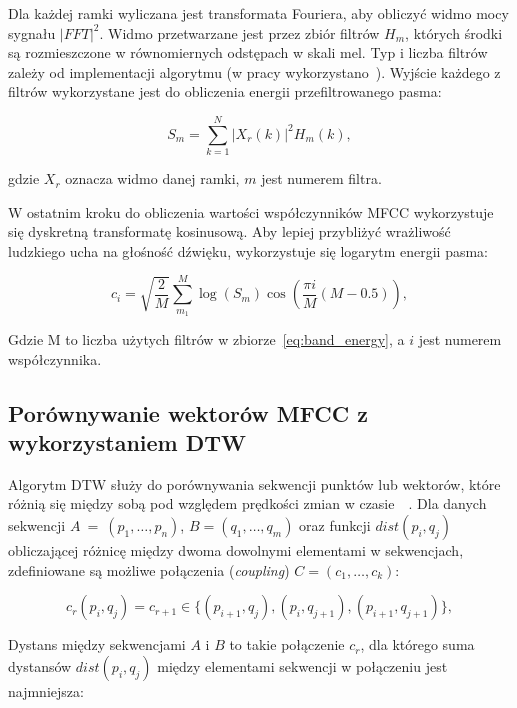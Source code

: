Dla każdej ramki wyliczana jest transformata Fouriera, aby
obliczyć widmo mocy sygnału $|FFT|^2$. Widmo przetwarzane jest
przez zbiór filtrów $H_m$, których środki są rozmieszczone
w równomiernych odstępach w skali mel. Typ i liczba filtrów zależy
od implementacji algorytmu (w pracy wykorzystano~\cite{librosa}).
Wyjście każdego z filtrów wykorzystane
jest do obliczenia energii przefiltrowanego pasma:

\begin{equation}
  S_m = \sum_{k=1}^{N}| X_r(k) |^2 H_m(k),
  \label{eq:band_energy}
\end{equation}

\noindent
gdzie $X_r$ oznacza widmo danej ramki, $m$ jest numerem filtra.

W ostatnim kroku do obliczenia wartości współczynników MFCC
wykorzystuje się dyskretną transformatę kosinusową.
Aby lepiej przybliżyć wrażliwość ludzkiego ucha na głośność dźwięku,
wykorzystuje się logarytm energii pasma:

\begin{equation}
  c_i = \sqrt{\frac{2}{M}} \sum_{m_1}^{M} \log(S_m) \cos( \frac{\pi i}{M}(M - 0.5) ),
  \label{eq:mfcc_coefficients}
\end{equation}

Gdzie M to liczba użytych filtrów w zbiorze~\ref{eq:band_energy},
a $i$ jest numerem współczynnika.

\subsection{Porównywanie wektorów MFCC z wykorzystaniem DTW}

Algorytm DTW służy do porównywania sekwencji punktów lub wektorów, które
różnią się między sobą pod względem prędkości zmian w czasie~\cite{dtw_time_complexity}~\cite{mfcc_dtw}.
Dla danych sekwencji $A~=~(p_1, \ldots, p_n)$, $B = (q_1, \ldots, q_m)$
oraz funkcji $dist(p_i, q_j)$ obliczającej różnicę między dwoma dowolnymi elementami w sekwencjach,
zdefiniowane są możliwe połączenia (\textit{coupling}) $C = (c_1, \ldots, c_k)$:

\begin{equation}
  c_r(p_i, q_j) = c_{r+1} \in \{ (p_{i+1}, q_j), (p_i, q_{j+1}), (p_{i+1}, q_{j+1}) \},
  \label{eq:dtw_coupling}
\end{equation}

Dystans między sekwencjami $A$ i $B$ to takie połączenie $c_r$, dla którego
suma dystansów $dist(p_i, q_j)$ między elementami sekwencji w połączeniu
jest najmniejsza:

